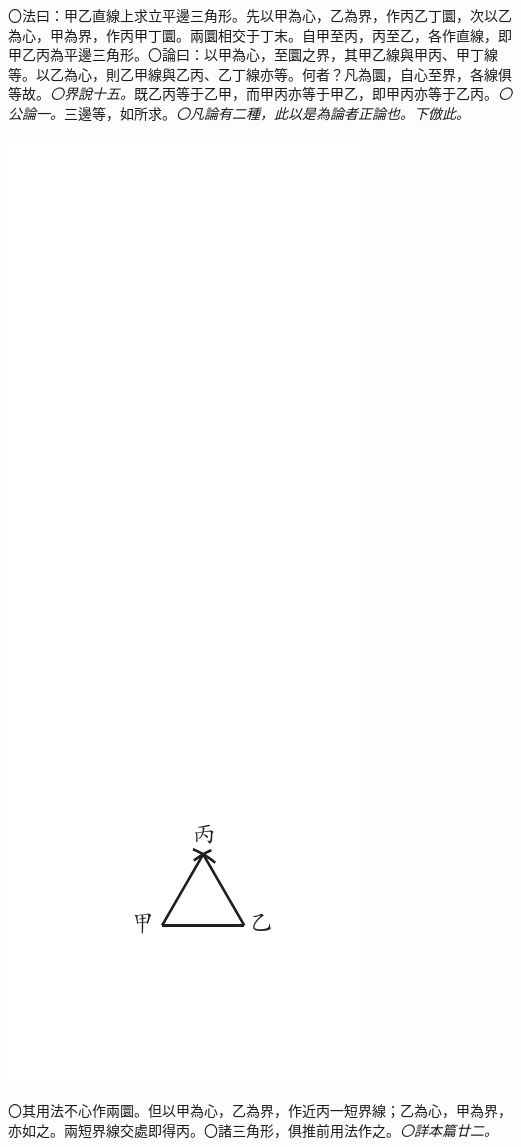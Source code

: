 \documentclass[12pt,b5paper,landscape]{article}
\newcommand{\ccom}[1]{{\footnotesize \emph{〇#1}}}
\newcommand{\bcom}[1]{〇#1}
\begin{document}
\begin{multicols}{2}
\begin{center}
\end{center}
\bcom{法曰：甲乙直線上求立平邊三角形。先以甲為心，乙為界，作丙乙丁圜，次以乙為心，甲為界，作丙甲丁圜。兩圜相交于丁末。自甲至丙，丙至乙，各作直線，即甲乙丙為平邊三角形。}\bcom{論曰：以甲為心，至圜之界，其甲乙線與甲丙、甲丁線等。以乙為心，則乙甲線與乙丙、乙丁線亦等。何者？凡為圜，自心至界，各線俱等故。\ccom{界說十五。}既乙丙等于乙甲，而甲丙亦等于甲乙，即甲丙亦等于乙丙。\ccom{公論一。}三邊等，如所求。\ccom{凡論有二種，此以是為論者正論也。下倣此。}}
\begin{center}
\includegraphics[angle=90]{eu35}
\end{center}
\bcom{其用法不心作兩圜。但以甲為心，乙為界，作近丙一短界線；乙為心，甲為界，亦如之。兩短界線交處即得丙。}\bcom{諸三角形，俱推前用法作之。\ccom{詳本篇廿二。}}


\end{multicols}
\end{document}
